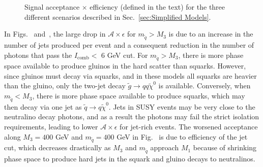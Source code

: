 \documentclass[dissertation.tex]{subfiles}
\begin{document}
\begin{figure}
	\caption{Signal acceptance $\times$ efficiency (defined in the text) for the three different scenarios described in Sec.~\ref{sec:Simplified Models}.}
	\label{fig:sig_Axe}
\end{figure}

In Figs.~ and~, the large drop in $\mathcal{A}\times\epsilon$ for $m_{\tilde{q}} > M_{3}$ is due to an increase in the number of jets produced per event and a consequent reduction in the number of photons that pass the $I_{\mathrm{comb}} <$ 6 GeV cut.  For $m_{\tilde{q}} > M_{3}$, there is more phase space available to produce gluinos in the hard scatter than squarks.  However, since gluinos must decay via squarks, and in these models all squarks are heavier than the gluino, only the two-jet decay $\tilde{g}\rightarrow qq\tilde{\chi}^{0}$ is available.  Conversely, when $m_{\tilde{q}} < M_{3}$, there is more phase space available to produce squarks, which may then decay via one jet as $\tilde{q}\rightarrow q\tilde{\chi}^{0}$.  Jets in SUSY events may be very close to the neutralino decay photons, and as a result the photons may fail the strict isolation requirements, leading to lower $\mathcal{A}\times\epsilon$ for jet-rich events.  The worsened acceptance along $M_{3} = 400$ GeV and $m_{\tilde{q}} = 400$ GeV in Fig.~ is due to efficiency of the jet cut, which decreases drastically as $M_{3}$ and $m_{\tilde{q}}$ approach $M_{1}$ because of shrinking  phase space to produce hard jets in the squark and gluino decays to neutralinos.
\end{document}
